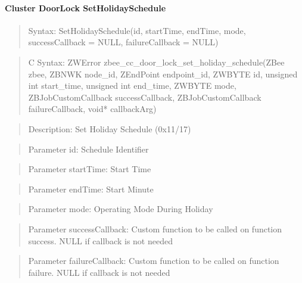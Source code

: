 \paragraph{Cluster DoorLock SetHolidaySchedule}
\begin{quote}Syntax: SetHolidaySchedule(id, startTime, endTime, mode, successCallback = NULL, failureCallback = NULL)\end{quote}
\begin{quote}C Syntax: ZWError zbee\_cc\_door\_lock\_set\_holiday\_schedule(ZBee zbee, ZBNWK node\_id, ZEndPoint endpoint\_id, ZWBYTE id, unsigned int start\_time, unsigned int end\_time, ZWBYTE mode, ZBJobCustomCallback successCallback, ZBJobCustomCallback failureCallback, void* callbackArg)\end{quote}
\begin{quote}Description: Set Holiday Schedule (0x11/17)\end{quote}
\begin{quote}Parameter id: Schedule Identifier\end{quote}
\begin{quote}Parameter startTime: Start Time\end{quote}
\begin{quote}Parameter endTime: Start Minute\end{quote}
\begin{quote}Parameter mode: Operating Mode During Holiday\end{quote}
\begin{quote}Parameter successCallback: Custom function to be called on function success. NULL if callback is not needed\end{quote}
\begin{quote}Parameter failureCallback: Custom function to be called on function failure. NULL if callback is not needed\end{quote}


